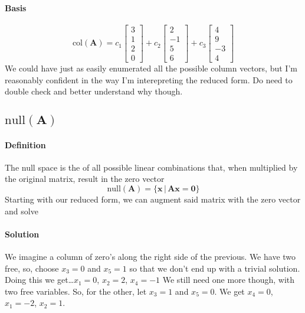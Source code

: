 \documentclass{article}
\begin{document}
            \paragraph{Basis}
                \[
                    \text{col}(\mathbf{A})=c_1\begin{bmatrix}3\\1\\2\\0\end{bmatrix}+c_2\begin{bmatrix}2\\-1\\5\\6\end{bmatrix}+c_3\begin{bmatrix}4\\9\\-3\\4\end{bmatrix}
                \]
            We could have just as easily enumerated all the possible column vectors, but I'm reasonably confident
            in the way I'm interepreting the reduced form. Do need to double check and better understand why though.
        \subsection[The null space of A]{$\text{null}(\mathbf{A})$}
            \paragraph{Definition}
                The null space is the of all possible linear combinations that, when multiplied by the original
                matrix, result in the zero vector
                \[
                    \text{null}(\mathbf{A})=\{\mathbf{x}\,|\,\mathbf{Ax}=\mathbf{0}\}
                \]
            Starting with our reduced form, we can augment said matrix with the zero vector and solve
            \paragraph{Solution}
                We imagine a column of zero's along the right side of the previous. We have two free, so, choose
                $x_3=0$ and $x_5=1$ so that we don't end up with a trivial solution. Doing this we get\dots$x_1=0$, $x_2=2$, $x_4=-1$
                We still need one more though, with two free variables. So, for the other, let $x_3=1$ and $x_5=0$.
                We get $x_4=0$, $x_1=-2$, $x_2=1$.
                
\end{document}
